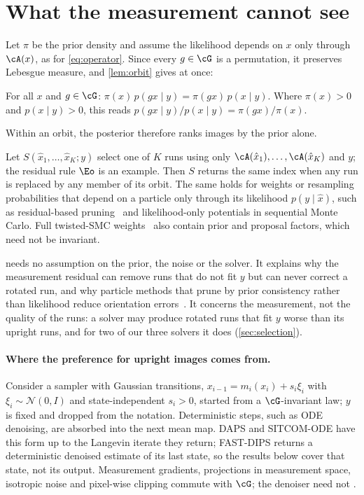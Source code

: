 \section{What the measurement cannot see}
\label{sec:symmetry}

Let $\pi$ be the prior density and assume the likelihood depends on $x$ only through $\cA(x)$, as for \cref{eq:operator}.
Since every $g\in\cG$ is a permutation, it preserves Lebesgue measure, and \cref{lem:orbit} gives at once:

\begin{proposition}
\label{prop:ratio}
For all $x$ and $g\in\cG$: $\pi(x)\,p(gx\mid y)=\pi(gx)\,p(x\mid y)$. Where $\pi(x)>0$ and $p(x\mid y)>0$, this reads $p(gx\mid y)/p(x\mid y)=\pi(gx)/\pi(x)$.
\end{proposition}

Within an orbit, the posterior therefore ranks images by the prior alone.

\begin{corollary}
\label{cor:blind}
Let $S(\hat x_1,\dots,\hat x_K;y)$ select one of $K$ runs using only $\cA(\hat x_1),\dots,\cA(\hat x_K)$ and $y$; the residual rule $\Eo$ is an example.
Then $S$ returns the same index when any run is replaced by any member of its orbit.
The same holds for weights or resampling probabilities that depend on a particle only through its likelihood $p(y\mid\hat x)$, such as residual-based pruning~\cite{makris2026tgd} and likelihood-only potentials in sequential Monte Carlo.
Full twisted-SMC weights~\cite{wu2023tds} also contain prior and proposal factors, which need not be invariant.
\end{corollary}

 needs no assumption on the prior, the noise or the solver.
It explains why the measurement residual can remove runs that do not fit $y$ but can never correct a rotated run, and why particle methods that prune by prior consistency rather than likelihood reduce orientation errors~\cite{kocabas2026pcdaps}.
It concerns the measurement, not the quality of the runs: a solver may produce rotated runs that fit $y$ worse than its upright runs, and for two of our three solvers it does (\cref{sec:selection}).

\paragraph{Where the preference for upright images comes from.}
Consider a sampler with Gaussian transitions, $x_{i-1}=m_i(x_i)+s_i\xi_i$ with $\xi_i\sim\mathcal N(0,I)$ and state-independent $s_i>0$, started from a $\cG$-invariant law; $y$ is fixed and dropped from the notation.
Deterministic steps, such as ODE denoising, are absorbed into the next mean map.
DAPS and SITCOM-ODE have this form up to the Langevin iterate they return; FAST-DIPS returns a deterministic denoised estimate of its last state, so the results below cover that state, not its output.
Measurement gradients, projections in measurement space, isotropic noise and pixel-wise clipping commute with $\cG$; the denoiser need not .

